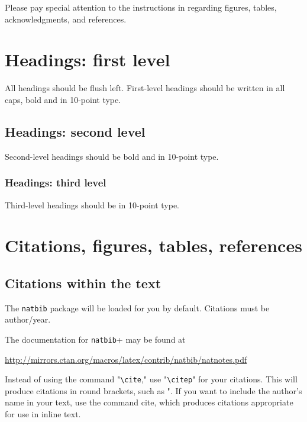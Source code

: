 \documentclass{aimc2026}
\begin{document}
Please pay special attention to the instructions in 
regarding figures, tables, acknowledgments, and references.

\section{Headings: first level}
\label{sec:headings}

All headings should be flush left.
First-level headings should be written in all caps, bold and in 10-point type.

\subsection{Headings: second level}
\label{sec:headings_second}

Second-level headings should be bold and in 10-point type.

\subsubsection{Headings: third level}
\label{sec:headings_third}

Third-level headings should be in 10-point type.


\section{Citations, figures, tables, references}
\label{sec:others}

\subsection{Citations within the text}
\label{sec:citations}

The \texttt{natbib} package will be loaded for you by default.
Citations must  be author/year.

The documentation for \texttt{natbib}+ may be found at
\begin{center}
  \url{http://mirrors.ctan.org/macros/latex/contrib/natbib/natnotes.pdf}
\end{center}

Instead of using the command "\texttt{\textbackslash cite}," use "\texttt{\textbackslash citep}" for your citations. This will produce citations in round brackets, such as "\citep{partiexample,bookexample}.
If you want to include the author's name in your text, use the command cite, which produces citations appropriate for use in inline text.
\end{document}
